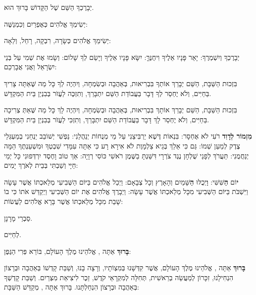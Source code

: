 \divider


יְבָרֶכְךָ הַשֵּׁם שֶׁל הַקָּדוֹשׁ בָּרוּךְ הוּא.

יְשִׂימְךָ אֱלֹהִים כְּאֶפְרַיִם וְכִמְנַשֶּׁה:

יְשִׂימֵךְ אֱלֹהִים כְּשָׂרָה, רִבְקָה, רָחֵל, וְלֵאָה:

יְבָרֶכְךָ \Shem{} וְיִשְׁמְרֶךָ: יָאֵר \Shem{} פָּנָיו אֵלֶיךָ וִיחֻנֶּךָּ: יִשָּׂא \Shem{} פָּנָיו אֵלֶיךָ וְיָשֵׂם לְךָ שָׁלוֹם: וְשָׂמוּ אֶת שְׁמִי עַל בְּנֵי יִשְׂרָאֵל וַאֲנִי אֲבָרְכֵם:

בִּזְכוּת הַשַּׁבָּת, הַשֵּׁם יְבָרֵךְ אוֹתְךָ בִּבְרִיאוּת, בְּאַהֲבָה וּבְשִׂמְחָה, וְיִהְיֶה לְךָ כָּל מַה שֶּׁאַתָּה צָרִיךְ בַּחַיִּים, וְלֹא יֶחְסַר לְךָ דָּבָר בַּעֲבוֹדַת הַשֵּׁם יִתְבָּרַךְ, וְתִזְכֶּה לַעֲזֹר בְּבִנְיַן בֵּית הַמִּקְדָּשׁ.

בִּזְכוּת הַשַּׁבָּת, הַשֵּׁם יְבָרֵךְ אוֹתָךְ בִּבְרִיאוּת, בְּאַהֲבָה וּבְשִׂמְחָה, וְיִהְיֶה לָךְ כָּל מַה שֶּׁאַתְּ צְרִיכָה בַּחַיִּים, וְלֹא יֶחְסַר לָךְ דָּבָר בַּעֲבוֹדַת הַשֵּׁם יִתְבָּרַךְ, וְתִזְכִּי לַעֲזֹר בְּבִנְיַן בֵּית הַמִּקְדָּשׁ.

\divider

\label{kiddush-shabbat-night}

\textbf{מִזְמוֹר לְדָוִד} \Shem{} רֹעִי לֹא אֶחְסָר: בִּנְאוֹת דֶּשֶׁא יַרְבִּיצֵנִי עַל מֵי מְנֻחוֹת יְנַהֲלֵנִי: נַפְשִׁי יְשׁוֹבֵב יַנְחֵנִי בְמַעְגְּלֵי צֶדֶק לְמַעַן שְׁמוֹ: גַּם כִּי אֵלֵךְ בְּגֵיא צַלְמָוֶת לֹא אִירָא רָע כִּי אַתָּה עִמָּדִי שִׁבְטְךָ וּמִשְׁעַנְתֶּךָ הֵמָּה יְנַחֲמֻנִי: תַּעֲרֹךְ לְפָנַי שֻׁלְחָן נֶגֶד צֹרְרָי דִּשַּׁנְתָּ בַשֶּׁמֶן רֹאשִׁי כּוֹסִי רְוָיָה: אַךְ טוֹב וָחֶסֶד יִרְדְּפוּנִי כָּל יְמֵי חַיָּי וְשַׁבְתִּי בְּבֵית \Shem{} לְאֹרֶךְ יָמִים:

 \textbf{י}וֹם \textbf{הַ}שִּׁשִּׁי: \textbf{וַ}יְכֻלּוּ \textbf{הַ}שָּׁמַיִם וְהָאָרֶץ וְכָל צְבָאָם: וַיְכַל אֱלֹהִים בַּיּוֹם הַשְּׁבִיעִי מְלַאכְתּוֹ אֲשֶׁר עָשָׂה וַיִּשְׁבֹּת בַּיּוֹם הַשְּׁבִיעִי מִכָּל מְלַאכְתּוֹ אֲשֶׁר עָשָׂה: וַיְבָרֶךְ אֱלֹהִים אֶת יוֹם הַשְּׁבִיעִי וַיְקַדֵּשׁ אֹתוֹ כִּי בוֹ שָׁבַת מִכָּל מְלַאכְתּוֹ אֲשֶׁר בָּרָא אֱלֹהִים לַעֲשׂוֹת:

סַבְרֵי מָרָנָן.

לְחַיִּים.

\textbf{בָּרוּךְ} אַתָּה \Shem{}, אֱלֹהֵינוּ מֶלֶךְ הָעוֹלָם, בּוֹרֵא פְּרִי הַגֶּפֶן:

\textbf{בָּרוּךְ} אַתָּה \Shem{}, אֱלֹהֵינוּ מֶלֶךְ הָעוֹלָם, אֲשֶׁר קִדְּשָׁנוּ בְּמִצְוֹתָיו, וְרָצָה בָנוּ, וְשַׁבַּת קָדְשׁוֹ בְּאַהֲבָה וּבְרָצוֹן הִנְחִילָנוּ, זִכָּרוֹן לְמַעֲשֵׂה בְרֵאשִׁית, תְּחִלָּה לְמִקְרָאֵי קֹדֶשׁ, זֵכֶר לִיצִיאַת מִצְרַיִם. וְשַׁבַּת קָדְשְׁךָ בְּאַהֲבָה וּבְרָצוֹן הִנְחַלְתָּנוּ. בָּרוּךְ אַתָּה \Shem{}, מְקַדֵּשׁ הַשַּׁבָּת:

